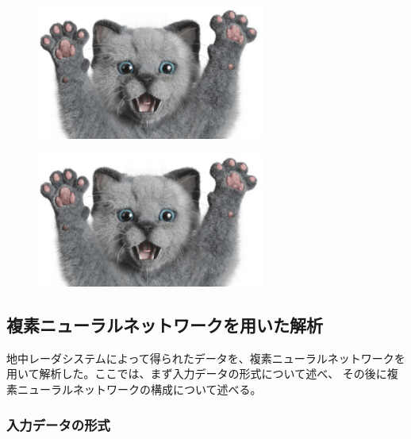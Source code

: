 \documentclass[11pt,a4paper,uplatex]{ujarticle}
\begin{document}
  \begin{figure}[tbp]
    \begin{minipage}[b]{0.495\textwidth}
      \centering
      \includegraphics[keepaspectratio, width=75mm]{Images/sampleneko.png}
      \label{fig:center_offset}
    \end{minipage}
    \begin{minipage}[b]{0.495\textwidth}
      \centering
      \includegraphics[keepaspectratio, width=75mm]{Images/sampleneko.png}
      \label{fig:actual_msr_range}
    \end{minipage}
  \end{figure}


  \subsection{複素ニューラルネットワークを用いた解析}\label{sec:analysis}
  地中レーダシステムによって得られたデータを、複素ニューラルネットワークを用いて解析した。ここでは、まず入力データの形式について述べ、
  その後に複素ニューラルネットワークの構成について述べる。
  \subsubsection{入力データの形式}
\end{document}
